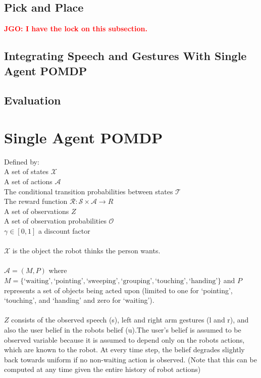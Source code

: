 \documentclass[graybox]{svmult}
\newcommand{\jgonote}[1]{\textcolor{red}{\textbf{JGO: #1}}}
\begin{document}
\subsection{Pick and Place}
\jgonote{I have the lock on this subsection.}
\subsection{Integrating Speech and Gestures With Single Agent POMDP}
\subsection{Evaluation}

\section{Single Agent POMDP}
Defined by:\\
A set of states $\mathcal{X}$\\
A set of actions $\mathcal{A}$\\
The conditional transition probabilities between states $\mathcal{T}$\\
The reward function $\mathcal{R}: \mathcal{S} \times \mathcal{A} \rightarrow R$\\
A set of observations $Z$\\
A set of observation probabilities $\mathcal{O}$\\
$\gamma \in [0,1]$ a discount factor\\\\
$\mathcal{X}$ is the object the robot thinks the person wants.\\\\
$\mathcal{A} = (M, P)$ where $M = \{\text{`waiting'}, \text{`pointing'},
\text{`sweeping'}, \text{`grouping'}, \text{`touching'}, \text{`handing'}\}$
and $P$ represents a set  of objects being acted upon (limited to one for
`pointing', `touching', and `handing' and zero for `waiting').\\\\
$Z$ consists of the observed speech (s), left and right arm gestures (l and r),
and also the user belief in the robots belief (u).The user's belief is assumed
to be observed variable because it is assumed to depend only on the robots
actions, which are known to the robot. At every time step, the belief degrades
slightly back towards uniform if no non-waiting action is observed. (Note that
this can be computed at any time given the entire history of robot actions)\\\\
\end{document}
